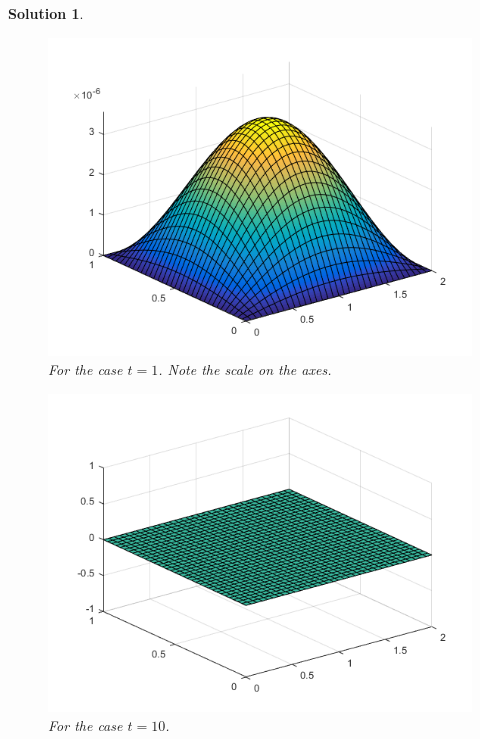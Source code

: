 \documentclass[leqno]{article}
\theoremstyle{nonumberplain}
\newtheorem{solution}{Solution}
\begin{document}
\begin{solution}
\begin{figure}[h]
    \centering
    \includegraphics{problem_2_t=1_hw_5.png}
    \caption{For the case $t=1$. Note the scale on the axes.}
    \label{fig:my_label}
\end{figure}
    
\pagebreak
    
\begin{figure}[h]
    \centering
    \includegraphics{problem_2_t=10_hw_5.png}
    \caption{For the case $t=10$.}
    \label{fig:my_label}
\end{figure}

\end{solution}
\pagebreak
\end{document}

